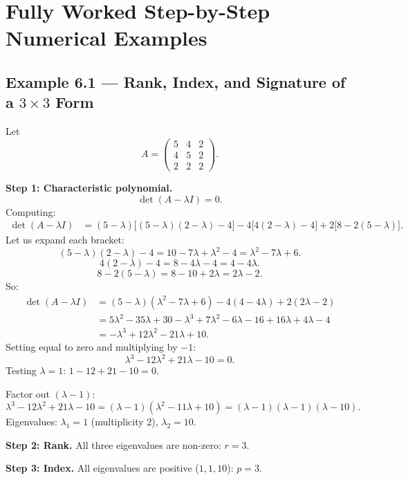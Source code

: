 \documentclass[12pt,a4paper]{article}
\begin{document}
\section{Fully Worked Step-by-Step Numerical Examples}

\subsection*{Example 6.1 --- Rank, Index, and Signature of a \(3 \times 3\) Form}

Let
\[
A = \begin{pmatrix} 5 & 4 & 2 \\ 4 & 5 & 2 \\ 2 & 2 & 2 \end{pmatrix}.
\]

\textbf{Step 1: Characteristic polynomial.}
\[
\det(A - \lambda I) = 0.
\]
Computing:
\begin{align*}
\det(A - \lambda I)
&= (5-\lambda)\bigl[(5-\lambda)(2-\lambda) - 4\bigr]
 - 4\bigl[4(2-\lambda) - 4\bigr]
 + 2\bigl[8 - 2(5-\lambda)\bigr].
\end{align*}
Let us expand each bracket:
\[
(5-\lambda)(2-\lambda) - 4 = 10 - 7\lambda + \lambda^2 - 4 = \lambda^2 - 7\lambda + 6.
\]
\[
4(2-\lambda) - 4 = 8 - 4\lambda - 4 = 4 - 4\lambda.
\]
\[
8 - 2(5-\lambda) = 8 - 10 + 2\lambda = 2\lambda - 2.
\]
So:
\begin{align*}
\det(A - \lambda I)
&= (5-\lambda)(\lambda^2 - 7\lambda + 6) - 4(4 - 4\lambda) + 2(2\lambda - 2) \\
&= 5\lambda^2 - 35\lambda + 30 - \lambda^3 + 7\lambda^2 - 6\lambda - 16 + 16\lambda + 4\lambda - 4 \\
&= -\lambda^3 + 12\lambda^2 - 21\lambda + 10.
\end{align*}
Setting equal to zero and multiplying by \(-1\):
\[
\lambda^3 - 12\lambda^2 + 21\lambda - 10 = 0.
\]
Testing \(\lambda = 1\): \(1 - 12 + 21 - 10 = 0\). \quad \checkmark

Factor out \((\lambda - 1)\):
\[
\lambda^3 - 12\lambda^2 + 21\lambda - 10 = (\lambda - 1)(\lambda^2 - 11\lambda + 10)
= (\lambda - 1)(\lambda - 1)(\lambda - 10).
\]
Eigenvalues: \(\lambda_1 = 1\) (multiplicity 2), \(\lambda_2 = 10\).

\textbf{Step 2: Rank.}
All three eigenvalues are non-zero: \(r = 3\).

\textbf{Step 3: Index.}
All eigenvalues are positive (\(1, 1, 10\)): \(p = 3\).
\end{document}
